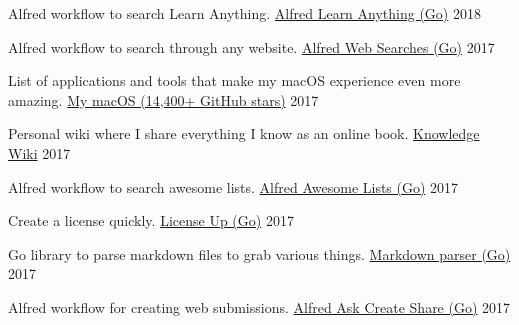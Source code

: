 
\begin{cventries}

  \cventry
    {Alfred workflow to search Learn Anything.}
    {\href{https://github.com/nikitavoloboev/alfred-learn-anything}{Alfred Learn Anything (Go)}}
    {}
    {2018}
    {
    }

    \cventry
    {Alfred workflow to search through any website.}
    {\href{https://github.com/nikitavoloboev/alfred-web-searches}{Alfred Web Searches (Go)}}
    {}
    {2017}
    {
    }

    \cventry
    {List of applications and tools that make my macOS experience even more amazing.}
    {\href{https://github.com/nikitavoloboev/my-mac-os}{My macOS (14,400+ GitHub stars)}}
    {}
    {2017}
    {
    }

    \cventry
    {Personal wiki where I share everything I know as an online book.}
    {\href{https://wiki.nikitavoloboev.xyz}{Knowledge Wiki}}
    {}
    {2017}
    {
    }

    \cventry
    {Alfred workflow to search awesome lists.}
    {\href{https://github.com/nikitavoloboev/alfred-awesome-lists}{Alfred Awesome Lists (Go)}}
    {}
    {2017}
    {
    }

    \cventry
    {Create a license quickly.}
    {\href{https://github.com/nikitavoloboev/license-up}{License Up (Go)}}
    {}
    {2017}
    {
    }

    \cventry
    {Go library to parse markdown files to grab various things.}
    {\href{https://github.com/nikitavoloboev/markdown-parser}{Markdown parser (Go)}}
    {}
    {2017}
    {
    }

    \cventry
    {Alfred workflow for creating web submissions.}
    {\href{https://github.com/nikitavoloboev/alfred-ask-create-share}{Alfred Ask Create Share (Go)}}
    {}
    {2017}
    {
    }

\end{cventries}
